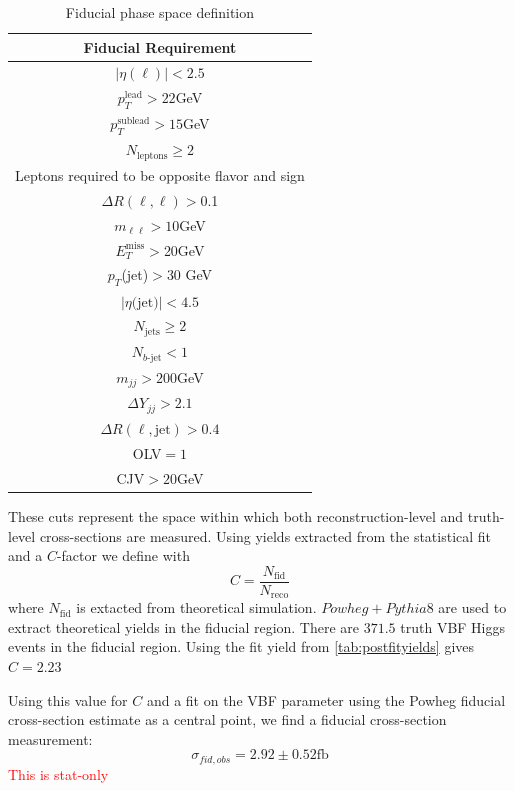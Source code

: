 \begin{table}[!ht]
\centering
\begin{tabular}{|c|}
\hline
Fiducial Requirement \\
\hline
$|\eta(\ell)|<2.5$ \\
$p_T^{\text{lead}}>22$GeV \\
$p_T^{\text{sublead}}>15$GeV \\
$N_{\text{leptons}}\geq2$ \\
Leptons required to be opposite flavor and sign \\
$\Delta R(\ell,\ell) >$0.1 \\
$m_{\ell\ell}>10$GeV \\
$E_T^{\text{miss}}>$20GeV \\
$p_T$(jet)$>$30 GeV \\
$|\eta\text{(jet)}|<4.5$ \\ 
$N_{\text{jets}} \geq 2$ \\
$N_{b\text{-jet}} < 1$ \\
$m_{jj} >200$GeV \\
$\Delta Y_{jj}>2.1$ \\
$\Delta R(\ell,\text{jet})>0.4$ \\
OLV$=1$ \\
CJV$>20$GeV \\
\hline
\end{tabular}
\caption{Fiducial phase space definition}
\label{tab:fiducial}
\end{table}
These cuts represent the space within which both reconstruction-level and truth-level cross-sections are measured. Using yields extracted from the statistical fit and a $C$-factor we define with 
\begin{equation}
C = \frac{N_\text{fid}}{N_{\text{reco}}}
\end{equation}
where $N_\text{fid}$ is extacted from theoretical simulation. $Powheg+Pythia8$ are used to extract theoretical yields in the fiducial region. There are $371.5$ truth VBF Higgs events in the fiducial region. Using the fit yield from \ref{tab:postfityields} gives $C=2.23$

Using this value for $C$ and a fit on the VBF parameter using the Powheg fiducial cross-section estimate as a central point, we find a fiducial cross-section measurement:
\begin{equation}
\sigma_{fid,obs} = 2.92 \pm 0.52 \text{fb} 
\end{equation}
\textcolor{red}{This is stat-only}

